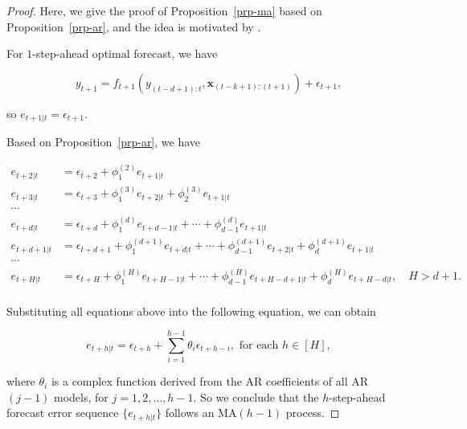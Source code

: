 \documentclass[
  11pt,
  a4paper,
]{article}
\theoremstyle{plain}
\theoremstyle{plain}
\theoremstyle{remark}
\begin{document}
\begin{proof}
Here, we give the proof of Proposition~\ref{prp-ma} based on
Proposition~\ref{prp-ar}, and the idea is motivated by
\textcite{sommer2023}.

For \(1\)-step-ahead optimal forecast, we have

\[
y_{t+1} = f_{t+1}(y_{(t-d+1):t},\bm{x}_{(t-k+1):(t+1)}) + \epsilon_{t+1},
\]

so \(e_{t+1|t}=\epsilon_{t+1}\).

Based on Proposition~\ref{prp-ar}, we have

\[
\begin{aligned}
e_{t+2|t} &= \epsilon_{t+2} + \phi_{1}^{(2)}e_{t+1|t} \\
e_{t+3|t} &= \epsilon_{t+3} + \phi_{1}^{(3)}e_{t+2|t} + \phi_{2}^{(3)}e_{t+1|t} \\
\cdots \\
e_{t+d|t} &= \epsilon_{t+d} + \phi_{1}^{(d)}e_{t+d-1|t} + \cdots + \phi_{d-1}^{(d)}e_{t+1|t} \\
e_{t+d+1|t} &= \epsilon_{t+d+1} + \phi_{1}^{(d+1)}e_{t+d|t} + \cdots + \phi_{d-1}^{(d+1)}e_{t+2|t} + \phi_{d}^{(d+1)}e_{t+1|t} \\
\cdots \\
e_{t+H|t} &= \epsilon_{t+H} + \phi_{1}^{(H)}e_{t+H-1|t} + \cdots + \phi_{d-1}^{(H)}e_{t+H-d+1|t} + \phi_{d}^{(H)}e_{t+H-d|t}, \quad H > d + 1. \\
\end{aligned}
\]

Substituting all equations above into the following equation, we can
obtain

\[
e_{t+h|t} = \epsilon_{t+h} + \sum_{i=1}^{h-1}\theta_{i}\epsilon_{t+h-i}, \text{ for each } h\in[H],
\]

where \(\theta_{i}\) is a complex function derived from the AR
coefficients of all AR\((j-1)\) models, for \(j = 1,2,\ldots,h-1\). So
we conclude that the \(h\)-step-ahead forecast error sequence
\(\{e_{t+h|t}\}\) follows an MA\((h-1)\) process.
\end{proof}
\end{document}
